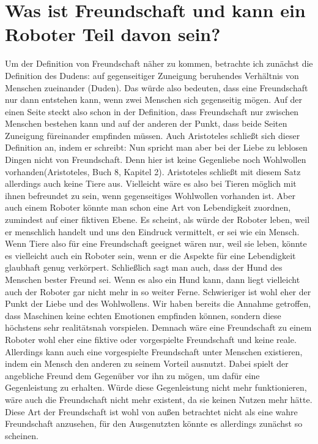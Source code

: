 \documentclass[12pt]{article}
\begin{document}
\section{Was ist Freundschaft und kann ein Roboter Teil davon sein?}
Um der Definition von Freundschaft näher zu kommen, betrachte ich zunächst die Definition des Dudens: \glqq auf gegenseitiger Zuneigung beruhendes Verhältnis von Menschen zueinander \grqq (Duden). Das würde also bedeuten, dass eine Freundschaft nur dann entstehen kann, wenn zwei Menschen sich gegenseitig mögen. Auf der einen Seite steckt also schon in der Definition, dass Freundschaft nur zwischen Menschen bestehen kann und auf der anderen der Punkt, dass beide Seiten Zuneigung füreinander empfinden müssen. Auch Aristoteles schließt sich dieser Definition an, indem er schreibt: \glqq Nun spricht man aber bei der Liebe zu leblosen Dingen nicht von Freundschaft. Denn hier ist keine Gegenliebe noch Wohlwollen vorhanden\grqq (Aristoteles, Buch 8, Kapitel 2).\newline
Aristoteles schließt mit diesem Satz allerdings auch keine Tiere aus. Vielleicht wäre es also bei Tieren möglich mit ihnen befreundet zu sein, wenn gegenseitiges Wohlwollen vorhanden ist. Aber auch einem Roboter könnte man schon eine Art von Lebendigkeit zuordnen, zumindest auf einer fiktiven Ebene. Es scheint, als würde der Roboter leben, weil er menschlich handelt und uns den Eindruck vermittelt, er sei wie ein Mensch. Wenn Tiere also für eine Freundschaft geeignet wären nur, weil sie leben, könnte es vielleicht auch ein Roboter sein, wenn er die Aspekte für eine Lebendigkeit glaubhaft genug verkörpert.\newline
Schließlich sagt man auch, dass der Hund des Menschen bester Freund sei. Wenn es also ein Hund kann, dann liegt vielleicht auch der Roboter gar nicht mehr in so weiter Ferne.\newline
Schwieriger ist wohl eher der Punkt der Liebe und des Wohlwollens. Wir haben bereits die Annahme getroffen, dass Maschinen keine echten Emotionen empfinden können, sondern diese höchstens sehr realitätsnah vorspielen. Demnach wäre eine Freundschaft zu einem Roboter wohl eher eine fiktive oder vorgespielte Freundschaft und keine reale. Allerdings kann auch eine vorgespielte Freundschaft unter Menschen existieren, indem ein Mensch den anderen zu seinem Vorteil ausnutzt. Dabei spielt der angebliche Freund dem Gegenüber vor ihn zu mögen, um dafür eine Gegenleistung zu erhalten. Würde diese Gegenleistung nicht mehr funktionieren, wäre auch die Freundschaft nicht mehr existent, da sie keinen Nutzen mehr hätte. Diese Art der Freundschaft ist wohl von außen betrachtet nicht als eine wahre Freundschaft anzusehen, für den Ausgenutzten könnte es allerdings zunächst so scheinen. \newline
\end{document}
